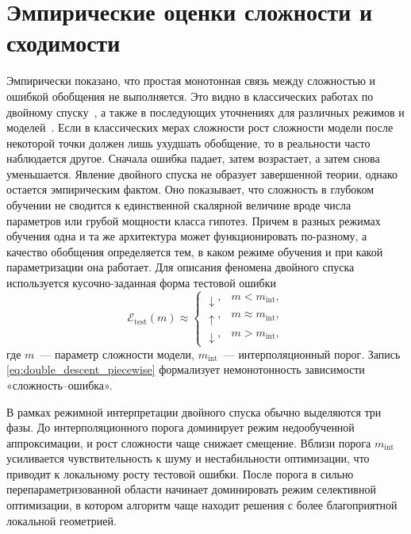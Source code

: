 \documentclass[russian]{intsys}
\begin{document}
\section{Эмпирические оценки сложности и сходимости}
Эмпирически показано, что простая монотонная связь между сложностью и ошибкой обобщения не выполняется. Это видно в классических работах по двойному спуску~\cite{belkin2019reconciling,nakkiran2021doubledescent}, а также в последующих уточнениях для различных режимов и моделей~\cite{shcherbina2024vcdd,song2019randomfeatures,advani2020highdim}.
Если в классических мерах сложности рост сложности модели после некоторой точки должен лишь ухудшать обобщение, то в реальности часто наблюдается другое.
Сначала ошибка падает, затем возрастает, а затем снова уменьшается.
Явление двойного спуска не образует завершенной теории, однако остается эмпирическим фактом.
Оно показывает, что сложность в глубоком обучении не сводится к единственной скалярной величине вроде числа параметров или грубой мощности класса гипотез.
Причем в разных режимах обучения одна и та же архитектура может функционировать по-разному, а качество обобщения определяется тем, в каком режиме обучения и при какой параметризации она работает.
Для описания феномена двойного спуска используется кусочно-заданная форма тестовой ошибки
\begin{equation}
\mathcal E_{\mathrm{test}}(m)\approx
\begin{cases}
\downarrow, & m<m_{\mathrm{int}},\\
\uparrow, & m\approx m_{\mathrm{int}},\\
\downarrow, & m>m_{\mathrm{int}},
\end{cases}
\label{eq:double_descent_piecewise}
\end{equation}
где $m$~--- параметр сложности модели, $m_{\mathrm{int}}$~--- интерполяционный порог. Запись \eqref{eq:double_descent_piecewise} формализует немонотонность зависимости «сложность--ошибка».

В рамках режимной интерпретации двойного спуска обычно выделяются три фазы. До интерполяционного порога доминирует режим недообученной аппроксимации, и рост сложности чаще снижает смещение. Вблизи порога $m_{\mathrm{int}}$ усиливается чувствительность к шуму и нестабильности оптимизации, что приводит к локальному росту тестовой ошибки. После порога в сильно перепараметризованной области начинает доминировать режим селективной оптимизации, в котором алгоритм чаще находит решения с более благоприятной локальной геометрией.
\end{document}
